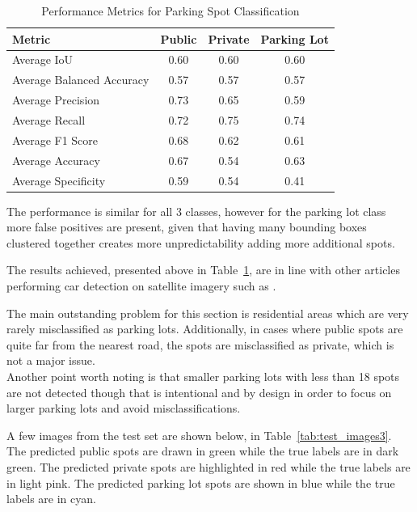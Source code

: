 \begin{table}[htbp]
  \centering
  \begin{tabular}{|l|c|c|c|}
    \hline
    \textbf{Metric}           & \textbf{Public} & \textbf{Private} & \textbf{Parking Lot} \\ \hline
    Average IoU               & 0.60            & 0.60             & 0.60                 \\ \hline
    Average Balanced Accuracy & 0.57            & 0.57             & 0.57                 \\ \hline
    Average Precision         & 0.73            & 0.65             & 0.59                 \\ \hline
    Average Recall            & 0.72            & 0.75             & 0.74                 \\ \hline
    Average F1 Score          & 0.68            & 0.62             & 0.61                 \\ \hline
    Average Accuracy          & 0.67            & 0.54             & 0.63                 \\ \hline
    Average Specificity       & 0.59            & 0.54             & 0.41                 \\ \hline
  \end{tabular}
  \caption{Performance Metrics for Parking Spot Classification}
  \label{tab:metrics3}
\end{table}

The performance is similar for all 3 classes, however for the parking lot class more false positives are present, given that having many bounding boxes clustered together creates more unpredictability adding more additional spots.

The results achieved, presented above in Table~\ref{tab:metrics3}, are in line with other articles performing car detection on satellite imagery such as \cite{similarresults}.

The main outstanding problem for this section is residential areas which are very rarely misclassified as parking lots.
Additionally, in cases where public spots are quite far from the nearest road, the spots are misclassified as private, which is not a major issue.\\
Another point worth noting is that smaller parking lots with less than 18 spots are not detected though that is intentional and by design in order to focus on larger parking lots and avoid misclassifications.

A few images from the test set are shown below, in Table~\ref{tab:test_images3}.
The predicted public spots are drawn in green while the true labels are in dark green. The predicted private spots are highlighted in red while the true labels are in light pink. The predicted parking lot spots are shown in blue while the true labels are in cyan.

